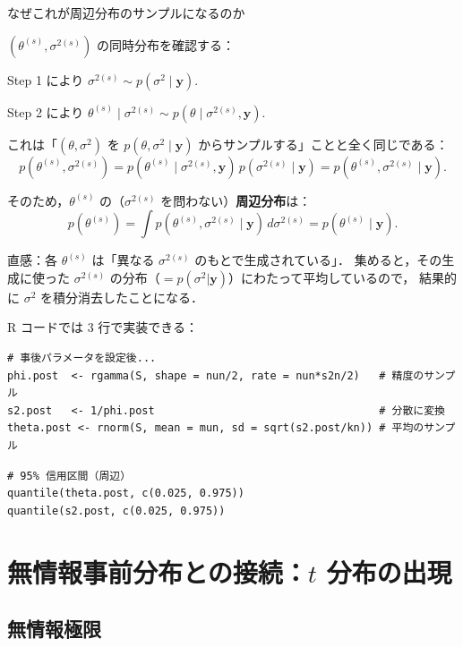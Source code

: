 \documentclass[lualatex,ja=standard,a4paper,12pt]{bxjsarticle}
\begin{document}
\begin{derivbox}{なぜこれが周辺分布のサンプルになるのか}

$(\theta^{(s)}, \sigma^{2(s)})$ の同時分布を確認する：

\medskip
\noindent Step 1 により $\sigma^{2(s)} \sim p(\sigma^2 \mid \mathbf{y})$.

\noindent Step 2 により $\theta^{(s)} \mid \sigma^{2(s)} \sim p(\theta \mid \sigma^{2(s)}, \mathbf{y})$.

\medskip
これは「$(\theta, \sigma^2)$ を $p(\theta, \sigma^2 \mid \mathbf{y})$ からサンプルする」ことと全く同じである：
\[
  p(\theta^{(s)}, \sigma^{2(s)})
  = p(\theta^{(s)} \mid \sigma^{2(s)}, \mathbf{y})\, p(\sigma^{2(s)} \mid \mathbf{y})
  = p(\theta^{(s)}, \sigma^{2(s)} \mid \mathbf{y}).
\]

そのため，$\theta^{(s)}$ の（$\sigma^{2(s)}$ を問わない）\textbf{周辺分布}は：
\[
  p(\theta^{(s)}) = \int p(\theta^{(s)}, \sigma^{2(s)} \mid \mathbf{y})\, d\sigma^{2(s)}
  = p(\theta^{(s)} \mid \mathbf{y}).
\]

直感：各 $\theta^{(s)}$ は「異なる $\sigma^{2(s)}$ のもとで生成されている」．
集めると，その生成に使った $\sigma^{2(s)}$ の分布（$= p(\sigma^2|\mathbf{y})$）にわたって平均しているので，
結果的に $\sigma^2$ を積分消去したことになる．
\end{derivbox}

\noindent R コードでは 3 行で実装できる：

\begin{lstlisting}
# 事後パラメータを設定後...
phi.post  <- rgamma(S, shape = nun/2, rate = nun*s2n/2)   # 精度のサンプル
s2.post   <- 1/phi.post                                   # 分散に変換
theta.post <- rnorm(S, mean = mun, sd = sqrt(s2.post/kn)) # 平均のサンプル
\end{lstlisting}

\begin{lstlisting}
# 95% 信用区間（周辺）
quantile(theta.post, c(0.025, 0.975))
quantile(s2.post, c(0.025, 0.975))
\end{lstlisting}


\section{無情報事前分布との接続：$t$ 分布の出現}

\subsection{無情報極限}
\end{document}
